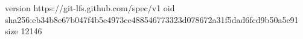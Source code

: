 version https://git-lfs.github.com/spec/v1
oid sha256:eb34b8e67b047f4b5e4973ce488546773323d078672a31f5dad6fcd9b50a5e91
size 12146
